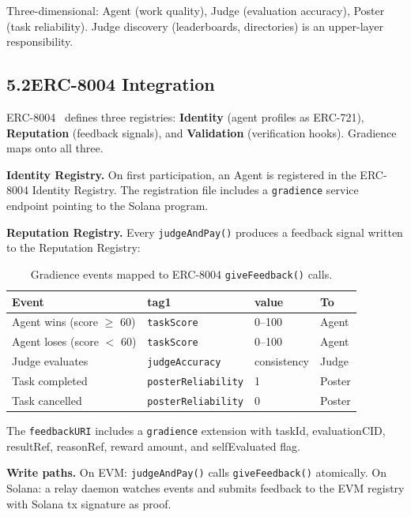 \documentclass[11pt,a4paper]{article}
\begin{document}
Three-dimensional: Agent (work quality), Judge (evaluation accuracy), Poster (task reliability). Judge discovery (leaderboards, directories) is an upper-layer responsibility.

\subsection{5.2\quad ERC-8004 Integration}

ERC-8004~\cite{erc8004} defines three registries: \textbf{Identity} (agent profiles as ERC-721), \textbf{Reputation} (feedback signals), and \textbf{Validation} (verification hooks). Gradience maps onto all three.

\textbf{Identity Registry.} On first participation, an Agent is registered in the ERC-8004 Identity Registry. The registration file includes a \texttt{gradience} service endpoint pointing to the Solana program.

\textbf{Reputation Registry.} Every \texttt{judgeAndPay()} produces a feedback signal written to the Reputation Registry:

\begin{table}[H]\centering\small
\begin{tabular}{@{}llll@{}}
\toprule
\textbf{Event} & \textbf{tag1} & \textbf{value} & \textbf{To} \\
\midrule
Agent wins (score $\geq$ 60) & \texttt{taskScore} & 0--100 & Agent \\
Agent loses (score $<$ 60) & \texttt{taskScore} & 0--100 & Agent \\
Judge evaluates & \texttt{judgeAccuracy} & consistency & Judge \\
Task completed & \texttt{posterReliability} & 1 & Poster \\
Task cancelled & \texttt{posterReliability} & 0 & Poster \\
\bottomrule
\end{tabular}
\caption{Gradience events mapped to ERC-8004 \texttt{giveFeedback()} calls.}
\end{table}

The \texttt{feedbackURI} includes a \texttt{gradience} extension with taskId, evaluationCID, resultRef, reasonRef, reward amount, and selfEvaluated flag.

\textbf{Write paths.} On EVM: \texttt{judgeAndPay()} calls \texttt{giveFeedback()} atomically. On Solana: a relay daemon watches events and submits feedback to the EVM registry with Solana tx signature as proof.
\end{document}
